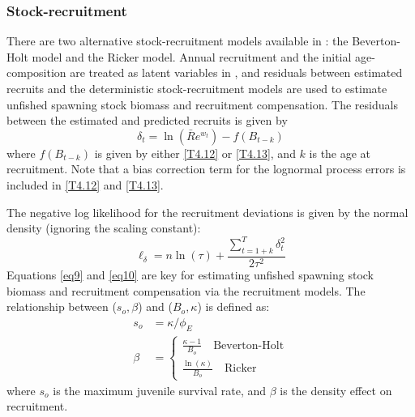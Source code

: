 \begin{multicols}{2}
\subsubsection{Stock-recruitment}
There are two alternative stock-recruitment models available in \iscam: the Beverton-Holt model and the Ricker model.  Annual recruitment and the initial age-composition are treated as latent variables in \iscam, and residuals between estimated recruits and the deterministic stock-recruitment models are used to estimate unfished spawning stock biomass and recruitment compensation.  The residuals between the estimated and predicted recruits is given by
\begin{equation}\label{eq9}
	\delta_t = \ln(\bar{R}e^{w_t}) - f(B_{t-k})
\end{equation}
where $f(B_{t-k})$ is given by either \eqref{T4.12} or \eqref{T4.13}, and $k$ is the age at recruitment.  Note that a bias correction term for the lognormal process  errors is included in  \eqref{T4.12} and \eqref{T4.13}.

The negative log likelihood for the recruitment deviations is given by the normal density (ignoring the scaling constant):
\begin{equation}\label{eq10}
 \ell_\delta = n\ln(\tau) + \frac{\sum_{t=1+k}^T \delta^2_t}{2\tau^2}
\end{equation}
Equations \eqref{eq9} and \eqref{eq10} are key for estimating unfished spawning stock biomass and recruitment compensation via the recruitment models.  The relationship between ($s_o,\beta$) and ($B_o,\kappa$) is defined as:
\begin{align}
s_o &= \kappa/\phi_E\\
\beta&=\begin{cases}
\frac{\kappa-1}{B_o} \quad \mbox{Beverton-Holt}\\[1ex]
\frac{\ln(\kappa)}{B_o} \quad \mbox{Ricker}
\end{cases}
\end{align}
where $s_o$ is the maximum juvenile survival rate, and $\beta$ is the density effect on recruitment.


\end{multicols}

